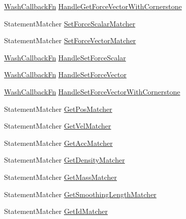 \begin{DoxyCompactItemize}
\item 
\mbox{\hyperlink{namespacews2st_a682dfda40d8282c7e579a7b826a7d861}{Wash\+Callback\+Fn}} \mbox{\hyperlink{namespacews2st_1_1refactor_1_1forces_a8d3f58b44208a7d72280ec2da12a1e1c}{Handle\+Get\+Force\+Vector\+With\+Cornerstone}}
\item 
Statement\+Matcher \mbox{\hyperlink{namespacews2st_1_1refactor_1_1forces_a9c5d51c1590ca8676aef6334240f1905}{Set\+Force\+Scalar\+Matcher}}
\item 
Statement\+Matcher \mbox{\hyperlink{namespacews2st_1_1refactor_1_1forces_a5448f17e7447d1916e92a643729467cb}{Set\+Force\+Vector\+Matcher}}
\item 
\mbox{\hyperlink{namespacews2st_a682dfda40d8282c7e579a7b826a7d861}{Wash\+Callback\+Fn}} \mbox{\hyperlink{namespacews2st_1_1refactor_1_1forces_a63b303b615f68b738bd347582f3c5819}{Handle\+Set\+Force\+Scalar}}
\item 
\mbox{\hyperlink{namespacews2st_a682dfda40d8282c7e579a7b826a7d861}{Wash\+Callback\+Fn}} \mbox{\hyperlink{namespacews2st_1_1refactor_1_1forces_afcc24d121d0d46682e7e62f46f120843}{Handle\+Set\+Force\+Vector}}
\item 
\mbox{\hyperlink{namespacews2st_a682dfda40d8282c7e579a7b826a7d861}{Wash\+Callback\+Fn}} \mbox{\hyperlink{namespacews2st_1_1refactor_1_1forces_a70e17f351ce695564866b57533b391bd}{Handle\+Set\+Force\+Vector\+With\+Cornerstone}}
\item 
Statement\+Matcher \mbox{\hyperlink{namespacews2st_1_1refactor_1_1forces_aaaeb388856aaaa572c942dc283398796}{Get\+Pos\+Matcher}}
\item 
Statement\+Matcher \mbox{\hyperlink{namespacews2st_1_1refactor_1_1forces_ac04dbb8d118a9abf10a6caddf80d27db}{Get\+Vel\+Matcher}}
\item 
Statement\+Matcher \mbox{\hyperlink{namespacews2st_1_1refactor_1_1forces_a2ba89815da3ec4b90de9e0eae901a156}{Get\+Acc\+Matcher}}
\item 
Statement\+Matcher \mbox{\hyperlink{namespacews2st_1_1refactor_1_1forces_a121159b5b664cf08979f380bfee9315f}{Get\+Density\+Matcher}}
\item 
Statement\+Matcher \mbox{\hyperlink{namespacews2st_1_1refactor_1_1forces_a322ae768bfaca37c335327edf032bdd1}{Get\+Mass\+Matcher}}
\item 
Statement\+Matcher \mbox{\hyperlink{namespacews2st_1_1refactor_1_1forces_ab0f4c93b9571ec62da5ebd98091d7b5f}{Get\+Smoothing\+Length\+Matcher}}
\item 
Statement\+Matcher \mbox{\hyperlink{namespacews2st_1_1refactor_1_1forces_ab20fa5472780bed0df716c1d4acb3f99}{Get\+Id\+Matcher}}

\end{DoxyCompactItemize}
